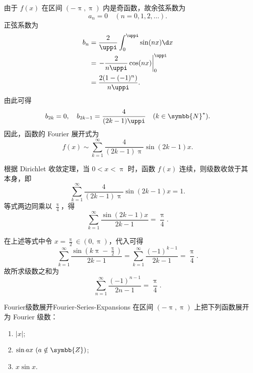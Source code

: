\begin{solution}
    由于 $f(x)$ 在区间 $(-\uppi, \uppi)$ 内是奇函数，故余弦系数为
    \begin{equation}\label{eq:sgn-an}
        a_n = 0 \quad (n = 0, 1, 2, \dots).
    \end{equation}
    正弦系数为
    \begin{equation}\label{eq:sgn-bn}
        \begin{aligned}
            b_n & = \frac{2}{\uppi} \int_{0}^{\uppi} \sin(nx) \d x        \\
                & = \left. -\frac{2}{n\uppi} \cos(nx) \right|_{0}^{\uppi} \\
                & = \frac{2(1 - (-1)^n)}{n\uppi}.
        \end{aligned}
    \end{equation}
    由此可得
    \begin{equation}\label{eq:sgn-bn-cases}
        b_{2k} = 0, \quad b_{2k-1} = \frac{4}{(2k-1)\uppi} \quad (k \in \symbb{N}^*).
    \end{equation}
    因此，函数的 Fourier 展开式为
    \begin{equation}
        \boxed{f(x) \sim \sum_{k=1}^{\infty} \frac{4}{(2k-1)\uppi} \sin(2k-1)x}.
    \end{equation}

    根据 Dirichlet 收敛定理，当 $0 < x < \uppi$ 时，函数 $f(x)$ 连续，则级数收敛于其本身，即
    \begin{equation}\label{eq:sgn-conv}
        \sum_{k=1}^{\infty} \frac{4}{(2k-1)\uppi} \sin(2k-1)x = 1.
    \end{equation}
    等式两边同乘以 $\frac{\uppi}{4}$，得
    \begin{equation}
        \boxed{\sum_{k=1}^{\infty} \frac{\sin(2k-1)x}{2k-1} = \frac{\uppi}{4}}.
    \end{equation}

    在上述等式中令 $x = \frac{\uppi}{2} \in (0, \uppi)$，代入可得
    \begin{equation}\label{eq:sub-x}
        \sum_{k=1}^{\infty} \frac{\sin(k\uppi - \frac{\uppi}{2})}{2k-1} = \sum_{k=1}^{\infty} \frac{(-1)^{k-1}}{2k-1} = \frac{\uppi}{4}.
    \end{equation}
    故所求级数之和为
    \begin{equation}
        \boxed{\sum_{n=1}^{\infty} \frac{(-1)^{n-1}}{2n-1} = \frac{\uppi}{4}}.
    \end{equation}
\end{solution}

\begin{problem}{Fourier级数展开}{Fourier-Series-Expansions}
    在区间 $(-\uppi, \uppi)$ 上把下列函数展开为 Fourier 级数：
    \begin{enumerate}
        \item $|x|$;
        \item $\sin ax \ (a \notin \symbb{Z})$;
        \item $x \sin x$.
    \end{enumerate}
\end{problem}

